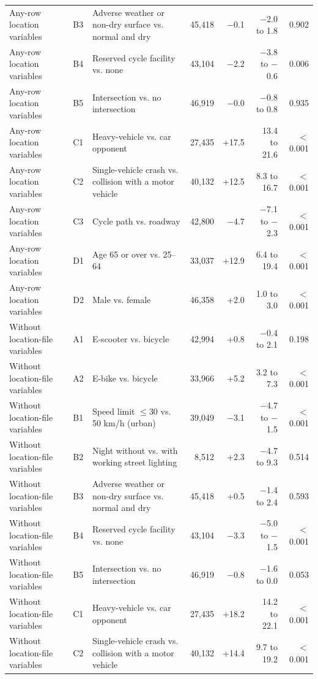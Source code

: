 \begin{table}[tp]
\begin{threeparttable}
{\begin{tabular}{p{4.6cm}lp{4.4cm}rrrr}
Any-row location variables & B3 & Adverse weather or non-dry surface vs. normal and dry & 45,418 & $-$0.1 & $-$2.0 to 1.8 & 0.902 \\
Any-row location variables & B4 & Reserved cycle facility vs. none & 43,104 & $-$2.2 & $-$3.8 to $-$0.6 & 0.006 \\
Any-row location variables & B5 & Intersection vs. no intersection & 46,919 & $-$0.0 & $-$0.8 to 0.8 & 0.935 \\
Any-row location variables & C1 & Heavy-vehicle vs. car opponent & 27,435 & +17.5 & 13.4 to 21.6 & $<$0.001 \\
Any-row location variables & C2 & Single-vehicle crash vs. collision with a motor vehicle & 40,132 & +12.5 & 8.3 to 16.7 & $<$0.001 \\
Any-row location variables & C3 & Cycle path vs. roadway & 42,800 & $-$4.7 & $-$7.1 to $-$2.3 & $<$0.001 \\
Any-row location variables & D1 & Age 65 or over vs. 25–64 & 33,037 & +12.9 & 6.4 to 19.4 & $<$0.001 \\
Any-row location variables & D2 & Male vs. female & 46,358 & +2.0 & 1.0 to 3.0 & $<$0.001 \\
Without location-file variables & A1 & E-scooter vs. bicycle & 42,994 & +0.8 & $-$0.4 to 2.1 & 0.198 \\
Without location-file variables & A2 & E-bike vs. bicycle & 33,966 & +5.2 & 3.2 to 7.3 & $<$0.001 \\
Without location-file variables & B1 & Speed limit $\leq$30 vs. 50 km/h (urban) & 39,049 & $-$3.1 & $-$4.7 to $-$1.5 & $<$0.001 \\
Without location-file variables & B2 & Night without vs. with working street lighting & 8,512 & +2.3 & $-$4.7 to 9.3 & 0.514 \\
Without location-file variables & B3 & Adverse weather or non-dry surface vs. normal and dry & 45,418 & +0.5 & $-$1.4 to 2.4 & 0.593 \\
Without location-file variables & B4 & Reserved cycle facility vs. none & 43,104 & $-$3.3 & $-$5.0 to $-$1.5 & $<$0.001 \\
Without location-file variables & B5 & Intersection vs. no intersection & 46,919 & $-$0.8 & $-$1.6 to 0.0 & 0.053 \\
Without location-file variables & C1 & Heavy-vehicle vs. car opponent & 27,435 & +18.2 & 14.2 to 22.1 & $<$0.001 \\
Without location-file variables & C2 & Single-vehicle crash vs. collision with a motor vehicle & 40,132 & +14.4 & 9.7 to 19.2 & $<$0.001 \\

\end{tabular}}
\end{threeparttable}
\end{table}
